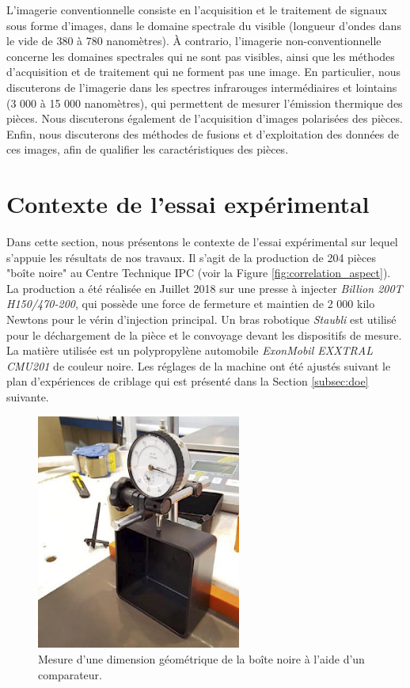 L'imagerie conventionnelle consiste en l'acquisition et le traitement de signaux sous forme d'images, dans le domaine spectrale du visible (longueur d'ondes dans le vide de 380 à 780 nanomètres).
À contrario, l'imagerie non-conventionnelle concerne les domaines spectrales qui ne sont pas visibles, ainsi que les méthodes d'acquisition et de traitement qui ne forment pas une image.
En particulier, nous discuterons de l'imagerie dans les spectres infrarouges intermédiaires et lointains (3 000 à 15 000 nanomètres), qui permettent de mesurer l'émission thermique des pièces.
Nous discuterons également de l'acquisition d'images polarisées des pièces.
Enfin, nous discuterons des méthodes de fusions et d'exploitation des données de ces images, afin de qualifier les caractéristiques des pièces.

\section{Contexte de l’essai expérimental} \label{sec:experiment}
Dans cette section, nous présentons le contexte de l'essai expérimental sur lequel s'appuie les résultats de nos travaux.
Il s'agit de la production de 204 pièces "boîte noire" au Centre Technique IPC (voir la Figure \ref{fig:correlation_aspect}).
La production a été réalisée en Juillet 2018 sur une presse à injecter \textit{Billion 200T H150/470-200}, qui possède une force de fermeture et maintien de 2 000 kilo Newtons pour le vérin d'injection principal.
Un bras robotique \textit{Staubli} est utilisé pour le déchargement de la pièce et le convoyage devant les dispositifs de mesure.
La matière utilisée est un polypropylène automobile \textit{ExonMobil EXXTRAL CMU201} de couleur noire.
Les réglages de la machine ont été ajustés suivant le plan d'expériences de criblage qui est présenté dans la Section \ref{subsec:doe} suivante.

\begin{figure}[hbtp]
	\centering
	\includegraphics[width=0.6\textwidth]{../Chap2/Figures/IPC_comparator.jpg}
	\caption{Mesure d'une dimension géométrique de la boîte noire à l'aide d'un comparateur.}
	\label{fig:comparator}
\end{figure}

